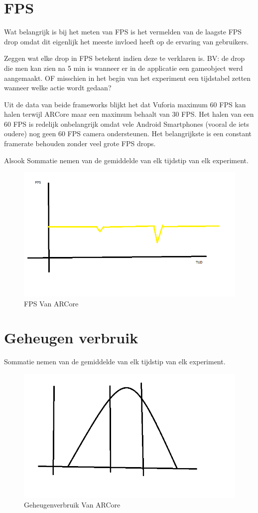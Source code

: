 \section{FPS}
Wat belangrijk is bij het meten van FPS is het vermelden van de laagste FPS drop omdat dit eigenlijk het meeste invloed heeft op de ervaring van gebruikers.

Zeggen wat elke drop in FPS betekent indien deze te verklaren is. BV: de drop die men kan zien na 5 min is wanneer er in de applicatie een gameobject werd aangemaakt. OF misschien in het begin van het experiment een tijdstabel zetten wanneer welke actie wordt gedaan?

Uit de data van beide frameworks blijkt het dat Vuforia maximum 60 FPS kan halen terwijl ARCore maar een maximum behaalt van 30 FPS. Het halen van een 60 FPS is redelijk onbelangrijk omdat vele Android Smartphones (vooral de iets oudere) nog geen 60 FPS camera ondersteunen. Het belangrijkste is een constant framerate behouden zonder veel grote FPS drops.

Alsook
Sommatie nemen van de gemiddelde van elk tijdstip van elk experiment.
\begin{figure}
    \includegraphics[width=\textwidth]{img/fpsgrafiek}\caption{FPS Van ARCore}\label{fig:fpsgr1}
\end{figure}
\section{Geheugen verbruik}
Sommatie nemen van de gemiddelde van elk tijdstip van elk experiment.
\begin{figure}
    \includegraphics[width=\textwidth]{img/normaleverdeling}\caption{Geheugenverbruik Van ARCore}\label{fig:mem1}
\end{figure}
